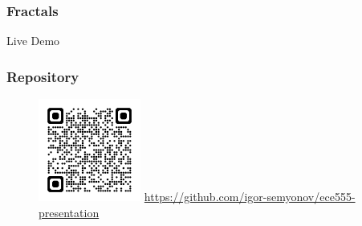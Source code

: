 \documentclass[aspectratio=169]{beamer}
\begin{document}
\begin{frame}
	\frametitle{Fractals}

	\centering
	\huge Live Demo
\end{frame}

\begin{frame}
	\frametitle{Repository}

	\begin{figure}
		\centering
		\includegraphics[width=0.3\textwidth]{./figures/qr-code.png}
        \url{https://github.com/igor-semyonov/ece555-presentation}
	\end{figure}
\end{frame}

\printbibliography
\end{document}

